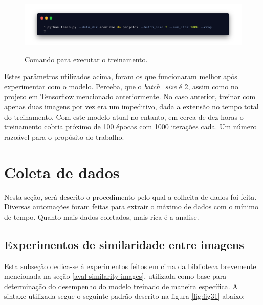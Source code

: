 \begin{figure}[H]
    \centering
    \caption{Comando para executar o treinamento.}
    \includegraphics[width=12cm]{fig/carbon_executar_projeto.png}
    \label{fig:fig30}
\end{figure}

Estes parâmetros utilizados acima, foram os que funcionaram melhor após experimentar com o modelo. Perceba, que o \textit{batch\_size} é 2, assim como no projeto em Tensorflow mencionado anteriormente. No caso anterior, treinar com apenas duas imagens por vez era um impeditivo, dada a extensão no tempo total do treinamento. Com este modelo atual no entanto, em cerca de dez horas o treinamento cobria próximo de 100 épocas com 1000 iterações cada. Um número razoável para o propósito do trabalho. 


\section{Coleta de dados}

Nesta seção, será descrito o procedimento pelo qual a colheita de dados foi feita. Diversas automações foram feitas para extrair o máximo de dados com o mínimo de tempo. Quanto mais dados coletados, mais rica é a analise.

\subsection{Experimentos de similaridade entre imagens}
\label{sec:experimentos-similaridade-imagens}

Esta subseção dedica-se à experimentos feitos em cima da biblioteca brevemente mencionada na seção \ref{aval-similarity-images}, utilizada como base para determinação do desempenho do modelo treinado de maneira específica. A sintaxe utilizada segue o seguinte padrão descrito na figura \ref{fig:fig31} abaixo:

